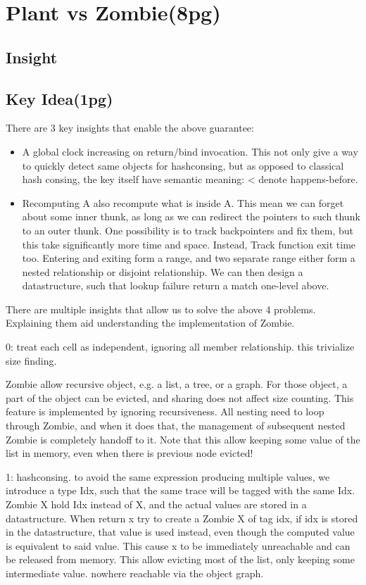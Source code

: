 \section{Plant vs Zombie(8pg)}
\subsection{Insight}

\subsection{Key Idea(1pg)}

There are 3 key insights that enable the above guarantee:
\begin{itemize}
	\item A global clock increasing on return/bind invocation. This not only give a way to quickly detect same objects for hashconsing, but as opposed to classical hash consing, the key itself have semantic meaning: < denote happens-before.
	\item Recomputing A also recompute what is inside A. This mean we can forget about some inner thunk, as long as we can redirect the pointers to such thunk to an outer thunk. One possibility is to track backpointers and fix them, but this take significantly more time and space. Instead, Track function exit time too. Entering and exiting form a range, and two separate range either form a nested relationship or disjoint relationship. We can then design a datastructure, such that lookup failure return a match one-level above.
\end{itemize}


There are multiple insights that allow us to solve the above 4 problems. Explaining them aid understanding the implementation of Zombie.

0: treat each cell as independent, ignoring all member relationship.
this trivialize size finding.

Zombie allow recursive object, e.g. a list, a tree, or a graph.
For those object, a part of the object can be evicted, and sharing does not affect size counting.
This feature is implemented by ignoring recursiveness. All nesting need to loop through Zombie, and when it does that, the management of subsequent nested Zombie is completely handoff to it.
Note that this allow keeping some value of the list in memory, even when there is previous node evicted!

1: hashconsing. to avoid the same expression producing multiple values, we introduce a type Idx, such that the same trace will be tagged with the same Idx.
Zombie X hold Idx instead of X, and the actual values are stored in a datastructure.
When return x try to create a Zombie X of tag idx, if idx is stored in the datastructure, that value is used instead, even though the computed value is equivalent to said value. This cause x to be immediately unreachable and can be released from memory. This allow evicting most of the list, only keeping some intermediate value. nowhere reachable via the object graph.

